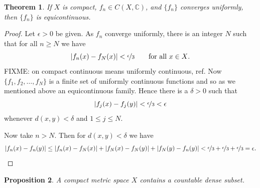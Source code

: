 \documentclass[12pt]{book}
\newcommand{\abs}[1]{\left\lvert {#1} \right\rvert}
\newcommand{\C}{{\mathbb{C}}}
\theoremstyle{plain}
\newtheorem{thm}{Theorem}[section]
\newtheorem{prop}[thm]{Proposition}
\theoremstyle{remark}
\theoremstyle{definition}
\theoremstyle{exercise}
\theoremstyle{example}
\begin{document}
%
%
%
%
%

\begin{thm}
If $X$ is compact, $f_n \in C(X,\C)$, and $\{ f_n \}$
converges uniformly, then $\{ f_n \}$ is equicontinuous.
\end{thm}

\begin{proof}
Let $\epsilon > 0$ be given.
As $f_n$ converge uniformly, there is an integer $N$ such that for
all $n \geq N$ we have
$$
\abs{f_n(x)-f_N(x)} < \nicefrac{\epsilon}{3} \qquad \text{for all $x \in X$}.
$$
FIXME: on compact continuous means uniformly continuous, ref.
Now $\{ f_1,f_2,\ldots,f_N \}$ is a finite set of uniformly continuous
functions and so as we mentioned above an equicontinuous family.  Hence
there is a $\delta > 0$ such that
$$
\abs{f_j(x)-f_j(y)} < \nicefrac{\epsilon}{3} < \epsilon
$$
whenever $d(x,y) < \delta$ and $1 \leq j \leq N$.

Now take $n > N$.  Then for $d(x,y) < \delta$ we have
\begin{equation*}
\abs{f_n(x)-f_n(y)}
\leq
\abs{f_n(x)-f_N(x)}
+
\abs{f_N(x)-f_N(y)}
+
\abs{f_N(y)-f_n(y)}
<
\nicefrac{\epsilon}{3}
+
\nicefrac{\epsilon}{3}
+
\nicefrac{\epsilon}{3}
=\epsilon .
\end{equation*}
\end{proof}

\begin{prop}
A compact metric space $X$ contains a countable dense subset.
\end{prop}
\end{document}
